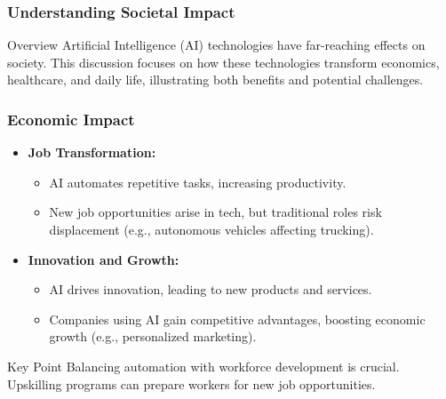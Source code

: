 \documentclass[aspectratio=169]{beamer}
\begin{document}
\begin{frame}[fragile]
    \frametitle{Understanding Societal Impact}
    \begin{block}{Overview}
        Artificial Intelligence (AI) technologies have far-reaching effects on society. This discussion focuses on how these technologies transform economics, healthcare, and daily life, illustrating both benefits and potential challenges.
    \end{block}
\end{frame}

\begin{frame}[fragile]
    \frametitle{Economic Impact}
    \begin{itemize}
        \item \textbf{Job Transformation:} 
            \begin{itemize}
                \item AI automates repetitive tasks, increasing productivity.
                \item New job opportunities arise in tech, but traditional roles risk displacement (e.g., autonomous vehicles affecting trucking).
            \end{itemize}
        
        \item \textbf{Innovation and Growth:} 
            \begin{itemize}
                \item AI drives innovation, leading to new products and services.
                \item Companies using AI gain competitive advantages, boosting economic growth (e.g., personalized marketing).
            \end{itemize}
    \end{itemize}
    
    \begin{block}{Key Point}
        Balancing automation with workforce development is crucial. Upskilling programs can prepare workers for new job opportunities.
    \end{block}
\end{frame}
\end{document}
